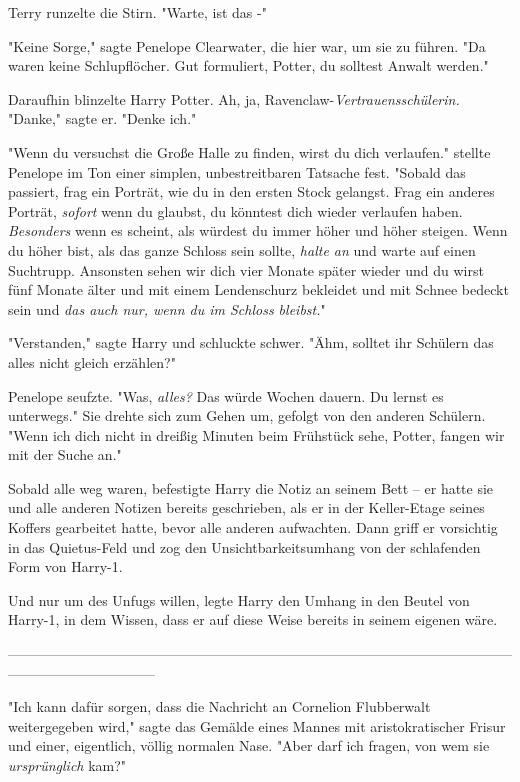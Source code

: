 {Terry runzelte die Stirn. "Warte, ist das -"

"Keine Sorge," sagte Penelope Clearwater, die hier war, um sie zu führen. "Da waren keine Schlupflöcher. Gut formuliert, Potter, du solltest Anwalt werden."

Daraufhin blinzelte Harry Potter. Ah, ja, Ravenclaw-\emph{Vertrauensschülerin.} "Danke," sagte er. "Denke ich."

"Wenn du versuchst die Große Halle zu finden, wirst du dich verlaufen." stellte Penelope im Ton einer simplen, unbestreitbaren Tatsache fest. "Sobald das passiert, frag ein Porträt, wie du in den ersten Stock gelangst. Frag ein anderes Porträt, \emph{sofort} wenn du glaubst, du könntest dich wieder verlaufen haben. \emph{Besonders} wenn es scheint, als würdest du immer höher und höher steigen. Wenn du höher bist, als das ganze Schloss sein sollte, \emph{halte an} und warte auf einen Suchtrupp. Ansonsten sehen wir dich vier Monate später wieder und du wirst fünf Monate älter und mit einem Lendenschurz bekleidet und mit Schnee bedeckt sein und \emph{das auch nur, wenn du im Schloss bleibst.}"

"Verstanden," sagte Harry und schluckte schwer. "Ähm, solltet ihr Schülern das alles nicht gleich erzählen?"

Penelope seufzte. "Was, \emph{alles?} Das würde Wochen dauern. Du lernst es unterwegs." Sie drehte sich zum Gehen um, gefolgt von den anderen Schülern. "Wenn ich dich nicht in dreißig Minuten beim Frühstück sehe, Potter, fangen wir mit der Suche an."

Sobald alle weg waren, befestigte Harry die Notiz an seinem Bett -- er hatte sie und alle anderen Notizen bereits geschrieben, als er in der Keller-Etage seines Koffers gearbeitet hatte, bevor alle anderen aufwachten. Dann griff er vorsichtig in das Quietus-Feld und zog den Unsichtbarkeitsumhang von der schlafenden Form von Harry-1.

Und nur um des Unfugs willen, legte Harry den Umhang in den Beutel von Harry-1, in dem Wissen, dass er auf diese Weise bereits in seinem eigenen wäre.

--------------------------------------------------------------------------------------------------------------------------------------------

"Ich kann dafür sorgen, dass die Nachricht an Cornelion Flubberwalt weitergegeben wird," sagte das Gemälde eines Mannes mit aristokratischer Frisur und einer, eigentlich, völlig normalen Nase. "Aber darf ich fragen, von wem sie \emph{ursprünglich} kam?"

}
